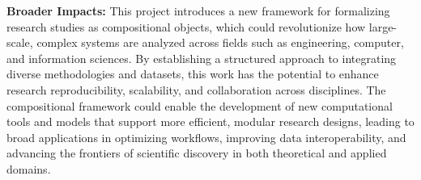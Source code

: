 \documentclass[11pt]{extarticle}
\begin{document}
\textbf{Broader Impacts:} This project introduces a new framework for formalizing research studies as compositional objects, which could revolutionize how large-scale, complex systems are analyzed across fields such as engineering, computer, and information sciences. By establishing a structured approach to integrating diverse methodologies and datasets, this work has the potential to enhance research reproducibility, scalability, and collaboration across disciplines. The compositional framework could enable the development of new computational tools and models that support more efficient, modular research designs, leading to broad applications in optimizing workflows, improving data interoperability, and advancing the frontiers of scientific discovery in both theoretical and applied domains.
\end{document}
